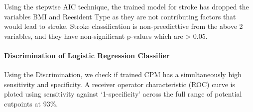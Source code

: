 \documentclass[]{article}
\newenvironment{Shaded}{\begin{snugshade}}{\end{snugshade}}
\newcommand{\CommentTok}[1]{\textcolor[rgb]{0.56,0.35,0.01}{\textit{#1}}}
\newcommand{\DataTypeTok}[1]{\textcolor[rgb]{0.13,0.29,0.53}{#1}}
\newcommand{\DecValTok}[1]{\textcolor[rgb]{0.00,0.00,0.81}{#1}}
\newcommand{\FloatTok}[1]{\textcolor[rgb]{0.00,0.00,0.81}{#1}}
\newcommand{\KeywordTok}[1]{\textcolor[rgb]{0.13,0.29,0.53}{\textbf{#1}}}
\newcommand{\NormalTok}[1]{#1}
\newcommand{\OperatorTok}[1]{\textcolor[rgb]{0.81,0.36,0.00}{\textbf{#1}}}
\newcommand{\OtherTok}[1]{\textcolor[rgb]{0.56,0.35,0.01}{#1}}
\newcommand{\StringTok}[1]{\textcolor[rgb]{0.31,0.60,0.02}{#1}}
\let\oldparagraph\paragraph
\renewcommand{\paragraph}[1]{\oldparagraph{#1}\mbox{}}
\begin{document}
Using the stepwise AIC technique, the trained model for stroke has
dropped the variables BMI and Reesident Type as they are not
contributing factors that would lead to stroke. Stroke classification is
non-preedicttive from the above 2 variables, and they have
non-significant p-values which are \textgreater{} 0.05.

\begin{Shaded}
\end{Shaded}

\hypertarget{discrimination-of-logistic-regression-classifier}{%
\paragraph{Discrimination of Logistic Regression
Classifier}\label{discrimination-of-logistic-regression-classifier}}

Using the Discrimination, we check if trained CPM has a simultaneously
high sensitivity and specificity. A receiver operator characteristic
(ROC) curve is ploted using sensitivity against `1-specificity' across
the full range of potential cutpoints at 93\%.

\begin{Shaded}
\end{Shaded}
\end{document}
